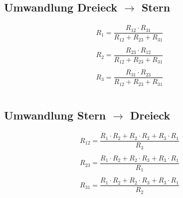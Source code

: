 \subsection{Umwandlung Dreieck $\to$ Stern}
\[ \begin{matrix}
R_1 = \dfrac{R_{12} \cdot R_{31}}{R_{12} + R_{23} + R_{31}}\\\\
R_2 = \dfrac{R_{23} \cdot R_{12}}{R_{12} + R_{23} + R_{31}}\\\\
R_3 = \dfrac{R_{31} \cdot R_{23}}{R_{12} + R_{23} + R_{31}}\\\\
\end{matrix} \]

\subsection{Umwandlung Stern $\to$ Dreieck}
\[ \begin{matrix}
R_{12} = \dfrac{R_1 \cdot R_2 + R_2 \cdot R_3 + R_3 \cdot R_1}{R_3}\\\\
R_{23} = \dfrac{R_1 \cdot R_2 + R_2 \cdot R_3 + R_3 \cdot R_1}{R_1}\\\\
R_{31} = \dfrac{R_1 \cdot R_2 + R_2 \cdot R_3 + R_3 \cdot R_1}{R_2}\\\\
\end{matrix} \]